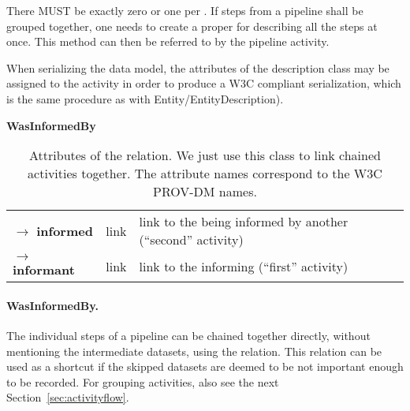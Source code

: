 There MUST be exactly zero or one  per . If steps from a 
pipeline shall be grouped together, one needs to create a proper 
 for describing all the steps at once. This method can then 
be referred to by the pipeline activity. 

When serializing the data model, the attributes
of the description class may be assigned to the activity in order to produce 
a W3C compliant serialization, which is the same procedure as with
 Entity\slash{}EntityDescription).

\begin{table}[h]
\small
{}\textwidth
\textbf{\normalsize WasInformedBy}\vspace{0.25em}\\
\begin{tabulary}{1.0\textwidth}{@{}lp{3cm}L@{}}
\toprule
{} &    & \\
\midrule
$\rightarrow$ \textbf{informed} & link      & link to the  being informed by another (``second'' activity)\\
$\rightarrow$ \textbf{informant}      & link      & link to the informing  (``first'' activity)\\
\bottomrule
\end{tabulary}
\caption[Attributes of the  relation]{Attributes of the
 relation. We just use this class to link chained activities together. The attribute names correspond to the W3C PROV-DM names.
}\label{tab:wasinformedby-attributes}
\end{table}

\paragraph{WasInformedBy.}
The individual steps of a pipeline can be chained together directly, without
mentioning the intermediate datasets, using the  relation.
This relation can be used as a shortcut if the skipped datasets are deemed
to be not important enough to be recorded. For grouping activities, also see
the next Section~\ref{sec:activityflow}.


